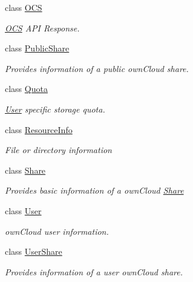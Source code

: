 \begin{DoxyCompactItemize}
class \hyperlink{classowncloudsharp_1_1_types_1_1_o_c_s}{O\+CS}
\begin{DoxyCompactList}\small\item\em \hyperlink{classowncloudsharp_1_1_types_1_1_o_c_s}{O\+CS} A\+PI Response. \end{DoxyCompactList}\item 
class \hyperlink{classowncloudsharp_1_1_types_1_1_public_share}{Public\+Share}
\begin{DoxyCompactList}\small\item\em Provides information of a public own\+Cloud share. \end{DoxyCompactList}\item 
class \hyperlink{classowncloudsharp_1_1_types_1_1_quota}{Quota}
\begin{DoxyCompactList}\small\item\em \hyperlink{classowncloudsharp_1_1_types_1_1_user}{User} specific storage quota. \end{DoxyCompactList}\item 
class \hyperlink{classowncloudsharp_1_1_types_1_1_resource_info}{Resource\+Info}
\begin{DoxyCompactList}\small\item\em File or directory information \end{DoxyCompactList}\item 
class \hyperlink{classowncloudsharp_1_1_types_1_1_share}{Share}
\begin{DoxyCompactList}\small\item\em Provides basic information of a own\+Cloud \hyperlink{classowncloudsharp_1_1_types_1_1_share}{Share} \end{DoxyCompactList}\item 
class \hyperlink{classowncloudsharp_1_1_types_1_1_user}{User}
\begin{DoxyCompactList}\small\item\em own\+Cloud user information. \end{DoxyCompactList}\item 
class \hyperlink{classowncloudsharp_1_1_types_1_1_user_share}{User\+Share}
\begin{DoxyCompactList}\small\item\em Provides information of a user own\+Cloud share. \end{DoxyCompactList}\end{DoxyCompactItemize}

